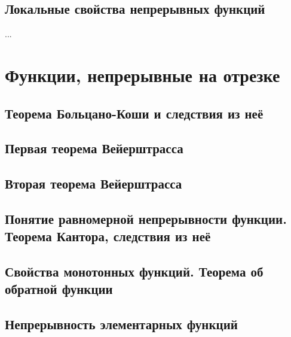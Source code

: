 \subsection{Локальные свойства непрерывных функций}
...

\section{Функции, непрерывные на отрезке}
\subsection{Теорема Больцано-Коши и следствия из неё}

\subsection{Первая теорема Вейерштрасса}

\subsection{Вторая теорема Вейерштрасса}

\subsection{Понятие равномерной непрерывности функции. Теорема Кантора, следствия из неё}


\subsection{Свойства монотонных функций. Теорема об обратной функции}


\subsection{Непрерывность элементарных функций}


